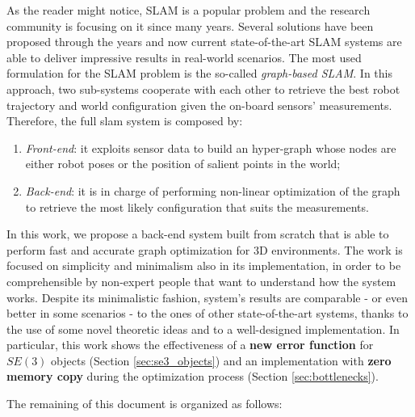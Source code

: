 As the reader might notice, SLAM is a popular problem and the research community is focusing on it since many years. Several solutions have been proposed through the years and now current state-of-the-art SLAM systems are able to deliver impressive results in real-world scenarios. The most used formulation for the SLAM problem is the so-called \textit{graph-based SLAM}. In this approach, two sub-systems cooperate with each other to retrieve the best robot trajectory and world configuration given the on-board sensors' measurements. Therefore, the full slam system is composed by:

\begin{enumerate}
    \item \textit{Front-end}: it exploits sensor data to build an hyper-graph whose nodes are either robot poses or the position of salient points in the world;
    \item \textit{Back-end}: it is in charge of performing non-linear optimization of the graph to retrieve the most likely configuration that suits the measurements.
\end{enumerate}

In this work, we propose a back-end system built from scratch that is able to perform fast and accurate graph optimization for 3D environments. The work is focused on simplicity and minimalism also in its implementation, in order to be comprehensible by non-expert people that want to understand how the system works. Despite its minimalistic fashion, system's results are comparable - or even better in some scenarios - to the ones of other state-of-the-art systems, thanks to the use of some novel theoretic ideas and to a well-designed implementation. In particular, this work shows the effectiveness of a \textbf{new error function} for $SE(3)$ objects (Section \ref{sec:se3_objects}) and an implementation with \textbf{zero memory copy} during the optimization process (Section \ref{sec:bottlenecks}).

\vspace{20px}

\noindent The remaining of this document is organized as follows:

